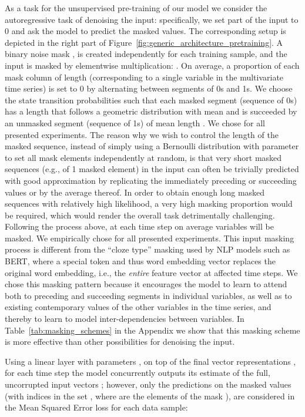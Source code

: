 \documentclass{article} \usepackage{iclr2021_conference,times}
\begin{document}
As a task for the unsupervised pre-training of our model we consider the autoregressive task of denoising the input: specifically, we set part of the input to 0 and ask the model to predict the masked values. The corresponding setup is depicted in the right part of Figure~\ref{fig:generic_architecture_pretraining}. A binary noise mask , is created independently for each training sample, and the input is masked by elementwise multiplication: . On average, a proportion  of each mask column of length  (corresponding to a single variable in the multivariate time series) is set to 0 by alternating between segments of 0s and 1s. We choose the state transition probabilities such that each masked segment (sequence of 0s) has a length that follows a geometric distribution with mean  and is succeeded by an unmasked segment (sequence of 1s) of mean length . We chose  for all presented experiments. The reason why we wish to control the length of the masked sequence, instead of simply using a Bernoulli distribution with parameter  to set all mask elements independently at random, is that very short masked sequences (e.g., of 1 masked element) in the input can often be trivially predicted with good approximation by replicating the immediately preceding or succeeding values or by the average thereof. In order to obtain enough long masked sequences with relatively high likelihood, a very high masking proportion  would be required, which would render the overall task detrimentally challenging. Following the process above, at each time step on average  variables will be masked. We empirically chose  for all presented experiments. This input masking process is different from the ``cloze type'' masking used by NLP models such as BERT, where a special token and thus word embedding vector replaces the original word embedding, i.e., the \textit{entire} feature vector at affected time steps. We chose this masking pattern because it encourages the model to learn to attend both to preceding and succeeding segments in individual variables, as well as to existing contemporary values of the other variables in the time series, and thereby to learn to model inter-dependencies between variables. In Table~\ref{tab:masking_schemes} in the Appendix we show that this masking scheme is more effective than other possibilities for denoising the input.

Using a linear layer with parameters ,  on top of the final vector representations , for each time step the model concurrently outputs its estimate  of the full, uncorrupted input vectors ; however, only the predictions on the masked values (with indices in the set , where  are the elements of the mask ), are considered in the Mean Squared Error loss for each data sample:
\end{document}
